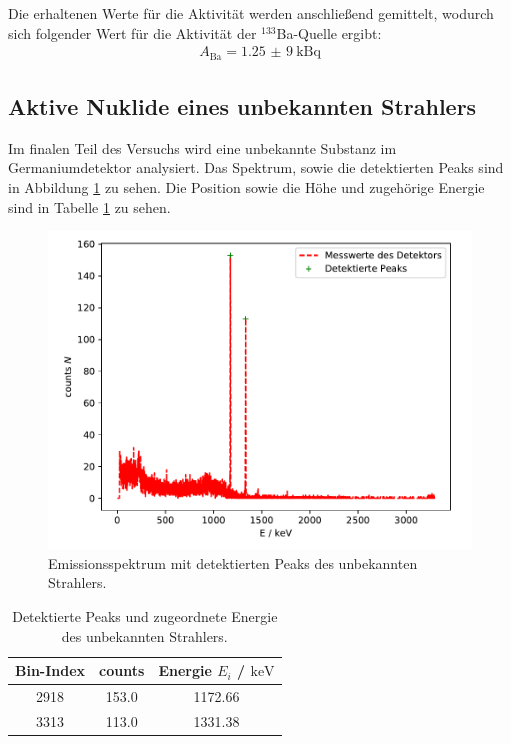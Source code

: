 \FloatBarrier
Die erhaltenen Werte für die Aktivität werden anschließend gemittelt, wodurch sich folgender Wert für die Aktivität der $^{133}$Ba-Quelle ergibt:
\begin{align*}
    A_\text{Ba} = \SI{1,25(9)}{\kilo \becquerel}
\end{align*}
\FloatBarrier


\subsection{Aktive Nuklide eines unbekannten Strahlers}
Im finalen Teil des Versuchs wird eine unbekannte Substanz im Germaniumdetektor analysiert. Das Spektrum, sowie die detektierten Peaks sind in Abbildung \ref{abb:unbekannt} zu sehen. Die Position sowie die Höhe und zugehörige Energie sind in Tabelle \ref{tab:unbekannt} zu sehen.
\FloatBarrier
\begin{figure}
    \centering
    \includegraphics[scale=0.7]{unbekannterStrahler.pdf}
    \caption{Emissionsspektrum mit detektierten Peaks des unbekannten Strahlers.}
    \label{abb:unbekannt}
\end{figure}
\FloatBarrier
\begin{table}
    \centering
    \caption{Detektierte Peaks und zugeordnete Energie des unbekannten Strahlers.}
    \label{tab:unbekannt}
    \begin{tabular}{ c c c }
    \toprule
    {Bin-Index} & {counts } & {Energie $E_i$ / $\si{\kilo\electronvolt}$}\\
    \midrule
    2918 & 153.0 & 1172.66       \\
    3313 & 113.0 & 1331.38       \\
    \bottomrule
    \end{tabular}
\end{table}
\FloatBarrier


